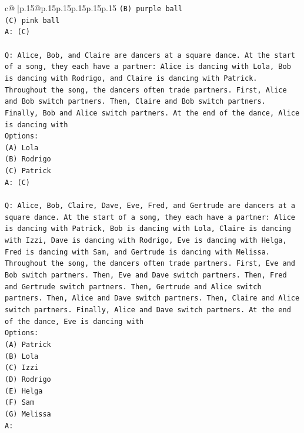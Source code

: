 \documentclass{article}
\begin{document}
{\begin{supertabular}{c@{$\;$}|p{.15\linewidth}@{}p{.15\linewidth}p{.15\linewidth}p{.15\linewidth}p{.15\linewidth}p{.15\linewidth}}
{{{\texttt{(B) purple ball} \\
\texttt{(C) pink ball} \\
\texttt{A: (C)} \\
\\ 
\texttt{Q: Alice, Bob, and Claire are dancers at a square dance. At the start of a song, they each have a partner: Alice is dancing with Lola, Bob is dancing with Rodrigo, and Claire is dancing with Patrick.} \\
\texttt{Throughout the song, the dancers often trade partners. First, Alice and Bob switch partners. Then, Claire and Bob switch partners. Finally, Bob and Alice switch partners. At the end of the dance, Alice is dancing with} \\
\texttt{Options:} \\
\texttt{(A) Lola} \\
\texttt{(B) Rodrigo} \\
\texttt{(C) Patrick} \\
\texttt{A: (C)} \\
\\ 
\texttt{Q: Alice, Bob, Claire, Dave, Eve, Fred, and Gertrude are dancers at a square dance. At the start of a song, they each have a partner: Alice is dancing with Patrick, Bob is dancing with Lola, Claire is dancing with Izzi, Dave is dancing with Rodrigo, Eve is dancing with Helga, Fred is dancing with Sam, and Gertrude is dancing with Melissa.} \\
\texttt{Throughout the song, the dancers often trade partners. First, Eve and Bob switch partners. Then, Eve and Dave switch partners. Then, Fred and Gertrude switch partners. Then, Gertrude and Alice switch partners. Then, Alice and Dave switch partners. Then, Claire and Alice switch partners. Finally, Alice and Dave switch partners. At the end of the dance, Eve is dancing with} \\
\texttt{Options:} \\
\texttt{(A) Patrick} \\
\texttt{(B) Lola} \\
\texttt{(C) Izzi} \\
\texttt{(D) Rodrigo} \\
\texttt{(E) Helga} \\
\texttt{(F) Sam} \\
\texttt{(G) Melissa} \\
\texttt{A:} \\
            }
        }
    }
     \\ \\


\end{supertabular}}
\end{document}

